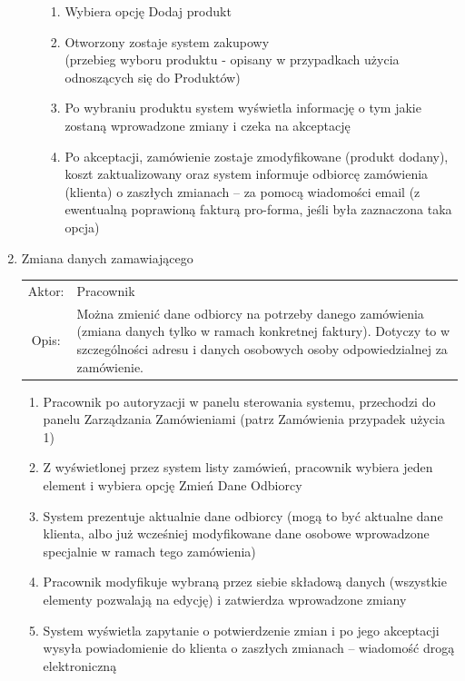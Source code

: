 \begin{enumerate}
\begin{enumerate}
\begin{enumerate}
		  \item Wybiera opcję Dodaj produkt
		  \item Otworzony zostaje system zakupowy\\ 
		  (przebieg wyboru produktu - opisany w przypadkach użycia odnoszących się do
		  Produktów)
		  \item Po wybraniu produktu system wyświetla informację o tym jakie zostaną
		  wprowadzone zmiany i czeka na akceptację
		  \item Po akceptacji, zamówienie zostaje zmodyfikowane (produkt dodany),
		  koszt zaktualizowany oraz system informuje odbiorcę zamówienia (klienta) o
		  zaszłych zmianach – za pomocą wiadomości email (z ewentualną poprawioną
		  fakturą pro-forma, jeśli była zaznaczona taka opcja) 
	  \end{enumerate} %
	\end{enumerate} %
  
  \item Zmiana danych zamawiającego\\
  \begin{tabularx}{\linewidth}{c X}
  Aktor: & Pracownik \\
  Opis: & Można zmienić dane odbiorcy na potrzeby danego zamówienia (zmiana
  danych tylko w ramach konkretnej faktury). Dotyczy to w szczególności adresu i
  danych osobowych osoby odpowiedzialnej za zamówienie.
  \end{tabularx}  
	\begin{enumerate}
	  \item Pracownik po autoryzacji w panelu sterowania systemu, przechodzi do
	  panelu Zarządzania Zamówieniami (patrz Zamówienia przypadek użycia 1)
	  \item Z wyświetlonej przez system listy zamówień, pracownik wybiera jeden
	  element i wybiera opcję Zmień Dane Odbiorcy
	  \item System prezentuje aktualnie dane odbiorcy (mogą to być aktualne dane
	  klienta, albo już wcześniej modyfikowane dane osobowe wprowadzone specjalnie w
	  ramach tego zamówienia)
	  \item Pracownik modyfikuje wybraną przez siebie składową danych (wszystkie
	  elementy pozwalają na edycję) i zatwierdza wprowadzone zmiany
	  \item System wyświetla zapytanie o potwierdzenie zmian i po jego akceptacji
	  wysyła powiadomienie do klienta o zaszłych zmianach – wiadomość drogą
	  elektroniczną
	\end{enumerate}


\end{enumerate}
